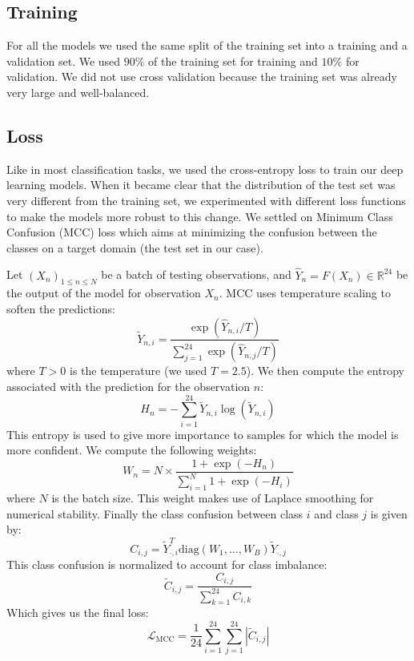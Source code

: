 \documentclass[switch, 11pt]{article}
\newcommand{\R}{\mathbb{R}}
\begin{document}
\begin{multicols}{2}
    \section{Training}

    For all the models we used the same split of the training set into a training and a validation set. We used $90\%$ of the training set for training and $10\%$ for validation. We did not use cross validation because the training set was already very large and well-balanced.

    \subsection{Loss}
    Like in most classification tasks, we used the cross-entropy loss to train our deep learning models. When it became clear that the distribution of the test set was very different from the training set, we experimented with different loss functions to make the models more robust to this change. We settled on Minimum Class Confusion (MCC) loss \cite{jin-2020} which aims at minimizing the confusion between the classes on a target domain (the test set in our case).

    Let $(X_n)_{1\leq n\leq N}$ be a batch of testing observations, and $\hat{Y}_n = F(X_n)\in\R^{24}$ be the output of the model for observation $X_n$. MCC uses temperature scaling to soften the predictions:
    \begin{equation}
        \tilde{Y}_{n,i} = \frac{\exp\left(\hat{Y}_{n,i}/T\right)}{\sum_{j=1}^{24}\exp\left(\hat{Y}_{n,j}/T\right)}
    \end{equation}
    where $T>0$ is the temperature (we used $T=2.5$). We then compute the entropy associated with the prediction for the observation $n$:
    \begin{equation}
        H_n = -\sum_{i=1}^{24}\tilde{Y}_{n,i}\log\left(\tilde{Y}_{n,i}\right)
    \end{equation}
    This entropy is used to give more importance to samples for which the model is more confident. We compute the following weights:
    \begin{equation}
        W_n = N\times\frac{1+\exp(-H_n)}{\sum_{i=1}^{N} 1+\exp(-H_i)}
    \end{equation}
    where $N$ is the batch size. This weight makes use of Laplace smoothing for numerical stability. Finally the class confusion between class $i$ and class $j$ is given by:
    \begin{equation}
        C_{i,j} = \tilde{Y}_{\cdot,i}^T \text{diag}(W_1,\dots,W_B) \tilde{Y}_{\cdot,j}
    \end{equation}
    This class confusion is normalized to account for class imbalance:
    \begin{equation}
        \tilde{C}_{i,j} = \frac{C_{i,j}}{\sum_{k=1}^{24}C_{i,k}}
    \end{equation}
    Which gives us the final loss:
    \begin{equation}
        \mathcal{L}_{\text{MCC}} = \frac{1}{24}\sum_{i=1}^{24}\sum_{j=1}^{24}\left|\tilde{C}_{i,j}\right|
    \end{equation}


\end{multicols}
\end{document}
